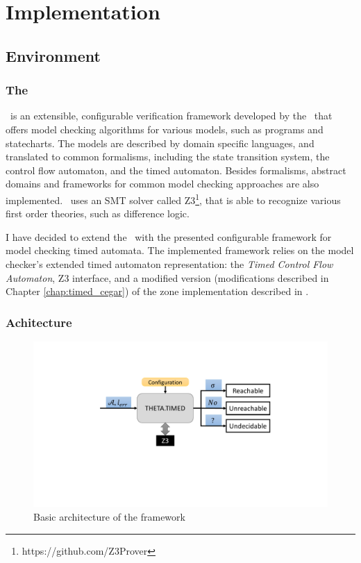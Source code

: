 \chapter{Implementation}\label{chap:impl}

\section{Environment}

\subsection{The \ttmcfw}

\ttmc\ is an extensible, configurable verification framework developed by the \bmemit\ that offers model checking algorithms for various models, such as programs and statecharts. The models are described by domain specific languages, and translated to common formalisms, including the state transition system, the control flow automaton, and the timed automaton. Besides formalisms, abstract domains and frameworks for common model checking approaches are also implemented. \ttmc\ uses an SMT solver called \textsc{Z3}\footnote{https://github.com/Z3Prover}, that is able to recognize various first order theories, such as difference logic.

I have decided to extend the \ttmcfw\ with the presented configurable framework for model checking timed automata. The implemented framework relies on the model checker's extended timed automaton representation: the \emph{Timed Control Flow Automaton}, Z3 interface, and a modified version (modifications described in Chapter \ref{chap:timed_cegar}) of the zone implementation described in \cite{bengtsson2004timed}.

\subsection{Achitecture}

\begin{figure}
	\centering
	\includegraphics[width=.7\textwidth]{include/figures/architecture}
	\caption{Basic architecture of the framework}
	\label{fig:arc}
\end{figure}

